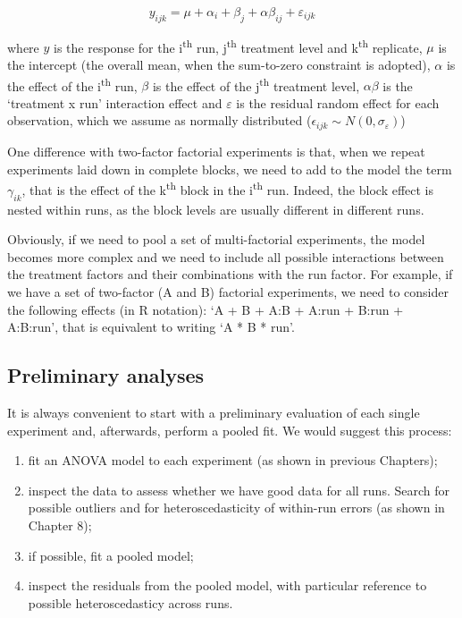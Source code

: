 \documentclass[a4paper,12pt,oneside]{book}
\providecommand{\tightlist}{%
  \setlength{\itemsep}{0pt}\setlength{\parskip}{0pt}}
\begin{document}
\[ y_{ijk} = \mu + \alpha_i + \beta_j + \alpha\beta_{ij} + \varepsilon_{ijk}\]

where \(y\) is the response for the i\textsuperscript{th} run, j\textsuperscript{th} treatment level and k\textsuperscript{th} replicate, \(\mu\) is the intercept (the overall mean, when the sum-to-zero constraint is adopted), \(\alpha\) is the effect of the i\textsuperscript{th} run, \(\beta\) is the effect of the j\textsuperscript{th} treatment level, \(\alpha\beta\) is the `treatment x run' interaction effect and \(\varepsilon\) is the residual random effect for each observation, which we assume as normally distributed (\(\epsilon_{ijk} \sim N(0, \sigma_{\varepsilon})\))

One difference with two-factor factorial experiments is that, when we repeat experiments laid down in complete blocks, we need to add to the model the term \(\gamma_{ik}\), that is the effect of the k\textsuperscript{th} block in the i\textsuperscript{th} run. Indeed, the block effect is nested within runs, as the block levels are usually different in different runs.

Obviously, if we need to pool a set of multi-factorial experiments, the model becomes more complex and we need to include all possible interactions between the treatment factors and their combinations with the run factor. For example, if we have a set of two-factor (A and B) factorial experiments, we need to consider the following effects (in R notation): `A + B + A:B + A:run + B:run + A:B:run', that is equivalent to writing `A * B * run'.

\hypertarget{preliminary-analyses}{%
\subsection{Preliminary analyses}\label{preliminary-analyses}}

It is always convenient to start with a preliminary evaluation of each single experiment and, afterwards, perform a pooled fit. We would suggest this process:

\begin{enumerate}
\def\labelenumi{\arabic{enumi}.}
\tightlist
\item
  fit an ANOVA model to each experiment (as shown in previous Chapters);
\item
  inspect the data to assess whether we have good data for all runs. Search for possible outliers and for heteroscedasticity of within-run errors (as shown in Chapter 8);
\item
  if possible, fit a pooled model;
\item
  inspect the residuals from the pooled model, with particular reference to possible heteroscedasticy across runs.
\end{enumerate}
\end{document}
